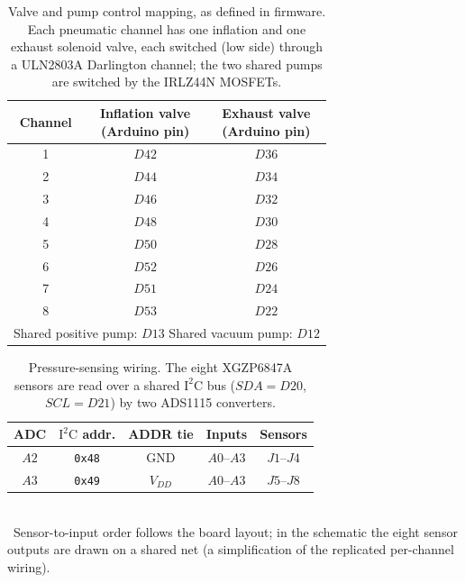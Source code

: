 \begin{table}[tb]
  \caption{Valve and pump control mapping, as defined in firmware. Each
  pneumatic channel has one inflation and one exhaust solenoid valve, each
  switched (low side) through a ULN2803A Darlington channel; the two shared
  pumps are switched by the IRLZ44N MOSFETs.}
  \label{tab:inchworm-valvewiring}
  \centering
  \footnotesize
  \setlength{\tabcolsep}{6pt}
  \begin{tabular}{|c|c|c|}
    \hline
    Channel & \makecell{Inflation valve\\(Arduino pin)} & \makecell{Exhaust valve\\(Arduino pin)} \\ \hline
    1 & $D42$ & $D36$ \\ \hline
    2 & $D44$ & $D34$ \\ \hline
    3 & $D46$ & $D32$ \\ \hline
    4 & $D48$ & $D30$ \\ \hline
    5 & $D50$ & $D28$ \\ \hline
    6 & $D52$ & $D26$ \\ \hline
    7 & $D51$ & $D24$ \\ \hline
    8 & $D53$ & $D22$ \\ \hline
    \multicolumn{3}{|c|}{Shared positive pump: $D13$ \quad\quad Shared vacuum pump: $D12$} \\ \hline
  \end{tabular}
\end{table}

\begin{table}[tb]
  \caption{Pressure-sensing wiring. The eight XGZP6847A sensors are read over
  a shared $\mathrm{I^2C}$ bus ($SDA=D20$, $SCL=D21$) by two ADS1115
  converters.}
  \label{tab:inchworm-sensorwiring}
  \centering
  \footnotesize
  \setlength{\tabcolsep}{4pt}
  \begin{tabular}{|c|c|c|c|c|}
    \hline
    ADC & $\mathrm{I^2C}$ addr. & ADDR tie & Inputs & Sensors\footnotemark[1] \\ \hline
    $A2$ & \texttt{0x48} & GND     & $A0$--$A3$ & $J1$--$J4$ \\ \hline
    $A3$ & \texttt{0x49} & $V_{DD}$ & $A0$--$A3$ & $J5$--$J8$ \\ \hline
  \end{tabular}
  \\[1mm]
  \footnotesize\footnotemark[1]~Sensor-to-input order follows the board
  layout; in the schematic the eight sensor outputs are drawn on a shared net
  (a simplification of the replicated per-channel wiring).
\end{table}
